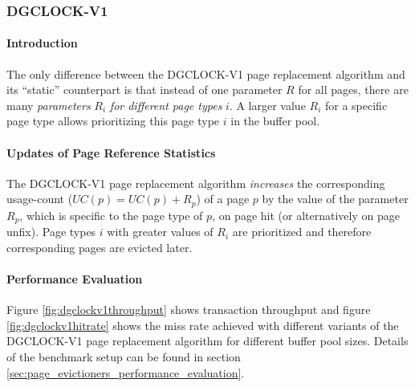 \subsubsection{DGCLOCK-V1} \label{subsubsec:dgclock-v1}

\paragraph{Introduction}

    The only difference between the DGCLOCK-V1 page replacement algorithm and its ``static'' counterpart  is that instead of one parameter $R$ for all pages, there are many \emph{parameters} $R_i$ \emph{for different page types} $i$. A larger value $R_i$ for a specific page type allows prioritizing this page type $i$ in the buffer pool.

\paragraph{Updates of Page Reference Statistics}

    The DGCLOCK-V1 page replacement algorithm \emph{increases} the corresponding usage-count ($UC\left(p\right) = UC\left(p\right) + R_p$) of a page $p$ by the value of the parameter $R_p$, which is specific to the page type of $p$, on page hit (or alternatively on page unfix). Page types $i$ with greater values of $R_i$ are prioritized and therefore corresponding pages are evicted later.

\paragraph{Performance Evaluation}

     Figure \ref{fig:dgclockv1throughput} shows transaction throughput and figure \ref{fig:dgclockv1hitrate} shows the miss rate achieved with different variants of the DGCLOCK-V1 page replacement algorithm for different buffer pool sizes. Details of the benchmark setup can be found in section \ref{sec:page_evictioners_performance_evaluation}.
    
